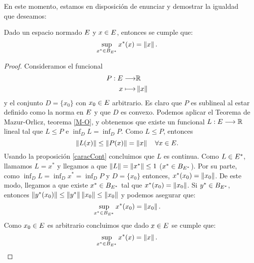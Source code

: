 En este momento, estamos en disposición de enunciar y demostrar la igualdad que deseamos:
\begin{proposicionBox}
	Dado un espacio normado $ E $ y $ x \in E $, entonces se cumple que:
	\begin{equation}\label{iguNorm}
	\sup_{x^* \in B_{E ^ *}} x^*(x) = \left\Vert x\right\Vert.
	\end{equation}
\end{proposicionBox}
\begin{proof}
Consideramos el funcional 
\begin{equation*}
\begin{split}
P:E \longrightarrow &\mathbb{R} \\
x \longmapsto &\left\Vert x\right\Vert
\end{split}
\end{equation*} 
y el conjunto $ D = \{x_0\} $ con $ x_0 \in E $ arbitrario. Es claro que $ P $ es sublineal al estar definido como la norma en $ E $ y que $ D $ es convexo. Podemos aplicar el Teorema de Mazur-Orlicz, teorema \ref{M-O}, y obtenemos que existe un funcional $ L:E \longrightarrow \mathbb{R} $ lineal tal que $ L \leq P $ e $ \inf_D L = \inf_D P $. Como $ L \leq P $, entonces 
\begin{equation*}
 	\left\Vert L(x)\right\Vert \leq \left\Vert P(x)\right\Vert = \left\Vert x\right\Vert \quad \forall x \in E.
\end{equation*}
Usando la proposición \ref{caracCont} concluimos que $ L $ es continua. Como $ L \in E ^* $, llamamos $ L = x^* $ y llegamos a que $ \left\Vert L\right\Vert = \left\Vert x^*\right\Vert  \leq 1$ ($ x^* \in  B_{E ^ *} $).  Por su parte, como  $ \inf_D L = \inf_D x^* = \inf_D P $ y $ D = \{x_0\} $ entonces, $ x^*(x_0) = \left\Vert x_0\right\Vert $. De este modo, llegamos a que existe $ x^* \in B_{E^*} $ tal que $ x^*(x_0) = \left\Vert x_0\right\Vert $. Si $ y^* \in B_{E^*}  $, entonces $ \left\Vert y^*(x_0)\right\Vert \leq \left\Vert y^*\right\Vert \left\Vert x_0\right\Vert \leq \left\Vert x_0\right\Vert $ y podemos asegurar que:
\[
\sup_{x^* \in B_{E ^ *}} x^*(x_0) = \left\Vert x_0\right\Vert.
\] 
Como $ x_0 \in E $ es arbitrario concluimos que dado $ x \in E $ se cumple que:
\begin{equation*}
\sup_{x^* \in B_{E ^ *}} x^*(x) = \left\Vert x\right\Vert.
\end{equation*}
\end{proof}